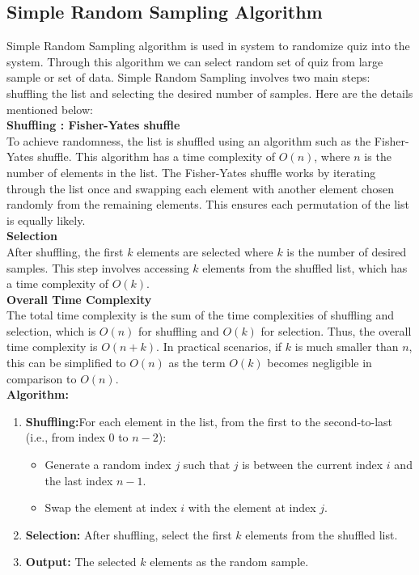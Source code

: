 \subsection{Simple Random Sampling Algorithm}
Simple Random Sampling algorithm is used in system to randomize quiz into the system. Through this algorithm we can select random set of quiz from large sample or set of data. Simple Random Sampling involves two main steps: shuffling the list and selecting the desired number of samples. Here are the details mentioned below:
\\
\textbf{Shuffling : Fisher-Yates shuffle}\\ To achieve randomness, the list is shuffled using an algorithm such as the Fisher-Yates shuffle. This algorithm has a time complexity of \( O(n) \), where \( n \) is the number of elements in the list. The Fisher-Yates shuffle works by iterating through the list once and swapping each element with another element chosen randomly from the remaining elements. This ensures each permutation of the list is equally likely.\\
 \textbf{Selection} \\After shuffling, the first \( k \) elements are selected where \( k \) is the number of desired samples. This step involves accessing \( k \) elements from the shuffled list, which has a time complexity of \( O(k) \).\\
\textbf{Overall Time Complexity} \\The total time complexity is the sum of the time complexities of shuffling and selection, which is \( O(n) \) for shuffling and \( O(k) \) for selection. Thus, the overall time complexity is \( O(n + k) \). In practical scenarios, if \( k \) is much smaller than \( n \), this can be simplified to \( O(n) \) as the term \( O(k) \) becomes negligible in comparison to \( O(n) \).\\
\textbf{Algorithm:}
\vspace{-\baselineskip}
\begin{enumerate}
    \item \textbf{Shuffling:}For each element in the list, from the first to the second-to-last (i.e., from index 0 to \( n-2 \)):
        \begin{itemize}
            \item Generate a random index \( j \) such that \( j \) is between the current index \( i \) and the last index \( n-1 \).
            \item Swap the element at index \( i \) with the element at index \( j \).
        \end{itemize}
    \item \textbf{Selection:} After shuffling, select the first \( k \) elements from the shuffled list.
    \item \textbf{Output:} The selected \( k \) elements as the random sample.
\end{enumerate}

